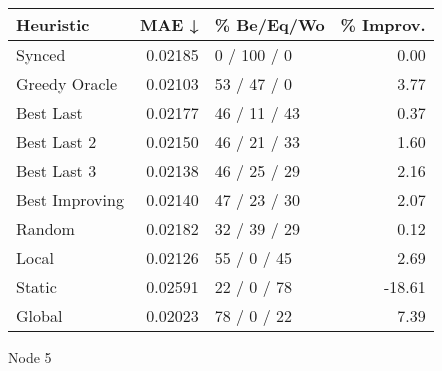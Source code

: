 \begin{tabular}{lrlr}
\toprule
\textbf{Heuristic} & \textbf{MAE ↓} & \textbf{\% Be/Eq/Wo} & \textbf{\% Improv.} \\
\midrule
            Synced &        0.02185 &          0 / 100 / 0 &                0.00 \\
     Greedy Oracle &        0.02103 &          53 / 47 / 0 &                3.77 \\
         Best Last &        0.02177 &         46 / 11 / 43 &                0.37 \\
       Best Last 2 &        0.02150 &         46 / 21 / 33 &                1.60 \\
       Best Last 3 &        0.02138 &         46 / 25 / 29 &                2.16 \\
    Best Improving &        0.02140 &         47 / 23 / 30 &                2.07 \\
            Random &        0.02182 &         32 / 39 / 29 &                0.12 \\
             Local &        0.02126 &          55 / 0 / 45 &                2.69 \\
            Static &        0.02591 &          22 / 0 / 78 &              -18.61 \\
            Global &        0.02023 &          78 / 0 / 22 &                7.39 \\
\bottomrule
\end{tabular}
\caption{Node 5}
\label{tab:iid_lr01_le1_bs2_5}

